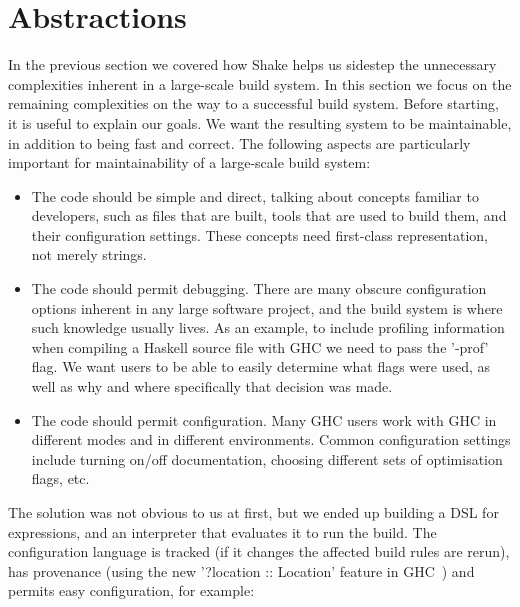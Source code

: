 \section{Abstractions\label{sec:abstractions}}


In the previous section we covered how Shake helps us sidestep the unnecessary
complexities inherent in a large-scale build system. In this section we focus on
the remaining complexities on the way to a successful build system. Before
starting, it is useful to explain our goals. We want the resulting system to be
maintainable, in addition to being fast and correct. The following
aspects are particularly important for maintainability of a large-scale build
system:

\begin{itemize}
\item The code should be simple and direct, talking about concepts familiar to
developers, such as files that are built, tools that are used to build
them, and their configuration settings. These concepts need first-class
representation, not merely strings.
\item The code should permit debugging. There are many obscure configuration
options inherent in any large software project, and the build system is where
such knowledge usually lives. As an example, to include profiling information
when compiling a Haskell source file with GHC we need to pass the \lst'-prof' flag.
We want users to be able to easily determine what flags were used, as well
as why and where specifically that decision was made.
\item The code should permit configuration. Many GHC users work with GHC in
different modes and in different environments. Common configuration settings
include turning on/off documentation, choosing different sets of optimisation flags,
etc.
\end{itemize}

The solution was not obvious to us at first, but we ended up building a DSL for
expressions, and an interpreter that evaluates it to run the build.
The configuration language is tracked (if it changes the affected build rules
are rerun), has provenance (using the new \lst'?location :: Location' feature in
GHC~) and permits easy configuration, for example:

